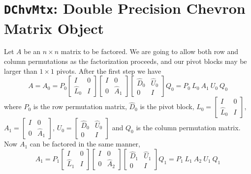 \section{{\tt DChvMtx}: Double Precision Chevron Matrix Object}
\par
Let $A$ be an $n \times n$ matrix to be factored.
We are going to allow both row and column permutations as the
factorization proceeds, and our pivot blocks may be larger 
than $1 \times 1$ pivots.
After the first step we have
$$
A = A_0 
=
P_0 
\left \lbrack \begin{array}{cc}
I   & 0 \\
{\hat L}_0 & I
\end{array} \right \rbrack
\left \lbrack \begin{array}{cc}
I   & 0 \\
0   & {\hat A}_1
\end{array} \right \rbrack
\left \lbrack \begin{array}{cc}
{\hat D}_0 & {\hat U}_0 \\
 0  & I
\end{array} \right \rbrack
Q_0
= P_0 \ L_0 \ A_1 \ U_0 \ Q_0 
$$
where $P_0$ is the row permutation matrix,
${\hat D}_0$ is the pivot block,
$\displaystyle L_0 =
\left \lbrack \begin{array}{cc}
I   & 0 \\
{\hat L}_0 & I
\end{array} \right \rbrack
$,
$\displaystyle A_1 =
\left \lbrack \begin{array}{cc}
I   & 0 \\
0   & {\hat A}_1
\end{array} \right \rbrack
$,
$\displaystyle U_0 =
\left \lbrack \begin{array}{cc}
{\hat D}_0 & {\hat U}_0 \\
 0  & I
\end{array} \right \rbrack
$ and
$Q_0$ is the column permutation matrix.
Now $A_1$ can be factored in the same manner,
$$
A_1 
=
P_1 
\left \lbrack \begin{array}{cc}
I   & 0 \\
{\hat L}_1 & I
\end{array} \right \rbrack
\left \lbrack \begin{array}{cc}
I   & 0 \\
0   & {\hat A}_2
\end{array} \right \rbrack
\left \lbrack \begin{array}{cc}
{\hat D}_1 & {\hat U}_1 \\
 0  & I
\end{array} \right \rbrack
Q_1
= P_1 \ L_1 \ A_2 \ U_1 \ Q_1
$$
